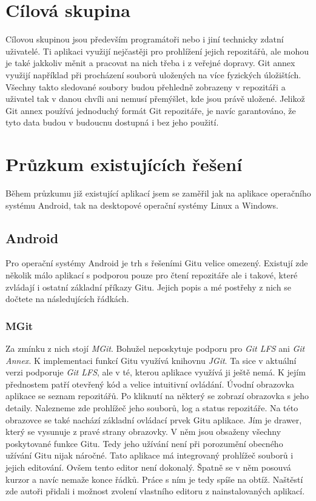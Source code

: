 \section{Cílová skupina}
Cílovou skupinou jsou především programátoři nebo i jiní technicky zdatní uživatelé. Ti aplikaci využijí nejčastěji pro prohlížení jejich repozitářů, ale mohou je také jakkoliv měnit a pracovat na nich třeba i z veřejné dopravy. Git annex využijí například při procházení souborů uložených na více fyzických úložištích. Všechny takto sledované soubory budou přehledně zobrazeny v repozitáři a uživatel tak v danou chvíli ani nemusí přemýšlet, kde jsou právě uložené. Jelikož Git annex používá jednoduchý formát Git repozitáře, je navíc garantováno, že tyto data budou v budoucnu dostupná i bez jeho použití.

\section{Průzkum existujících řešení}
Během průzkumu již existující aplikací jsem se zaměřil jak na aplikace operačního systému Android, tak na desktopové operační systémy Linux a Windows.

    \subsection {Android}
    Pro operační systémy Android je trh s řešeními Gitu velice omezený. Existují zde několik málo aplikací s podporou pouze pro čtení repozitáře ale i takové, které zvládají i ostatní základní příkazy Gitu. Jejich popis a mé postřehy z nich se dočtete na následujících řádkách.
    \subsubsection{MGit}
    Za zmínku z nich stojí \emph{MGit}. Bohužel neposkytuje podporu pro \emph{Git LFS} ani \emph{Git Annex}. K implementaci funkcí Gitu využívá knihovnu \emph{JGit}. Ta sice v aktuální verzi podporuje \emph{Git LFS}, ale v té, kterou aplikace využívá ji ještě nemá. K jejím přednostem patří otevřený kód a velice intuitivní ovládání.
    Úvodní obrazovka aplikace se seznam repozitářů. Po kliknutí na některý se zobrazí obrazovka s jeho detaily. Nalezneme zde prohlížeč jeho souborů, log a status repozitáře. Na této obrazovce se také nachází základní ovládací prvek Gitu aplikace. Jím je drawer, který se vysunuje z pravé strany obrazovky. V něm jsou obsaženy všechny poskytované funkce Gitu. Tedy jeho užívání není při porozumění obecného užívání Gitu nijak náročné. Tato aplikace má integrovaný prohlížeč souborů i jejich editování. Ovšem tento editor není dokonalý. Špatně se v něm posouvá kurzor a navíc nemaže konce řádků. Práce s ním je tedy spíše na obtíž. Naštěstí zde autoři přidali i možnost zvolení vlastního editoru z nainstalovaných aplikací.

